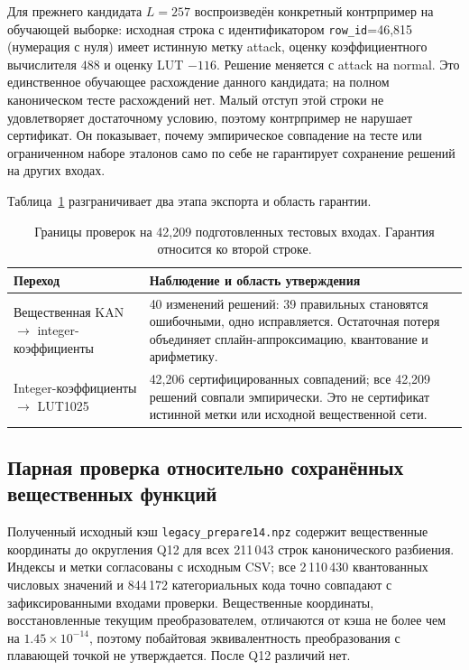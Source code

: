 Для прежнего кандидата $L=257$ воспроизведён конкретный контрпример на обучающей выборке: исходная строка с идентификатором \texttt{row\_id}=46,815 (нумерация с нуля) имеет истинную метку attack, оценку коэффициентного вычислителя $488$ и оценку LUT $-116$. Решение меняется с attack на normal. Это единственное обучающее расхождение данного кандидата; на полном каноническом тесте расхождений нет. Малый отступ этой строки не удовлетворяет достаточному условию, поэтому контрпример не нарушает сертификат. Он показывает, почему эмпирическое совпадение на тесте или ограниченном наборе эталонов само по себе не гарантирует сохранение решений на других входах.



Таблица~\ref{tab:export-boundaries} разграничивает два этапа экспорта и область гарантии.

\begin{table}[!htbp]
\centering\small
\caption{Границы проверок на 42,209 подготовленных тестовых входах. Гарантия относится ко второй строке.}
\label{tab:export-boundaries}
\begin{tabular}{p{5.0cm}p{9.9cm}}
\toprule
Переход & Наблюдение и область утверждения\\
\midrule
Вещественная KAN $\to$ integer-коэффициенты & 40 изменений решений: 39 правильных становятся ошибочными, одно исправляется. Остаточная потеря объединяет сплайн-аппроксимацию, квантование и арифметику.\\
Integer-коэффициенты $\to$ LUT1025 & 42,206 сертифицированных совпадений; все 42,209 решений совпали эмпирически. Это не сертификат истинной метки или исходной вещественной сети.\\
\bottomrule
\end{tabular}
\end{table}

\subsection{Парная проверка относительно сохранённых вещественных функций}
Полученный исходный кэш \texttt{legacy\_prepare14.npz} содержит вещественные координаты до округления Q12 для всех 211\,043 строк канонического разбиения. Индексы и метки согласованы с исходным CSV; все 2\,110\,430 квантованных числовых значений и 844\,172 категориальных кода точно совпадают с зафиксированными входами проверки. Вещественные координаты, восстановленные текущим преобразователем, отличаются от кэша не более чем на $1.45\times10^{-14}$, поэтому побайтовая эквивалентность преобразования с плавающей точкой не утверждается. После Q12 различий нет.

